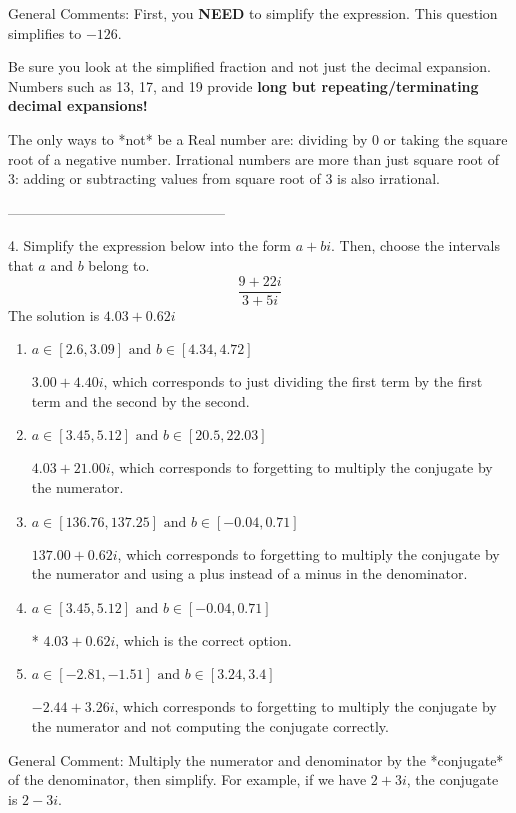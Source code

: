\documentclass{article}[14pt]
\begin{document}
General Comments: First, you \textbf{NEED} to simplify the expression. This question simplifies to $-126$. 
 
 Be sure you look at the simplified fraction and not just the decimal expansion. Numbers such as 13, 17, and 19 provide \textbf{long but repeating/terminating decimal expansions!} 
 
 The only ways to *not* be a Real number are: dividing by 0 or taking the square root of a negative number. Irrational numbers are more than just square root of 3: adding or subtracting values from square root of 3 is also irrational.

-----------------------------------------------

4. Simplify the expression below into the form $a+bi$. Then, choose the intervals that $a$ and $b$ belong to.
$$ \frac{9  + 22 i}{3  + 5 i} $$ 
The solution is $ 4.03  + 0.62 i $ 

\begin{enumerate}[label=\Alph*.] 
\item $ a \in [2.6, 3.09] \text{ and } b \in [4.34, 4.72] $ 

  $3.00  + 4.40 i$, which corresponds to just dividing the first term by the first term and the second by the second. 
\item $ a \in [3.45, 5.12] \text{ and } b \in [20.5, 22.03] $ 

  $4.03  + 21.00 i$, which corresponds to forgetting to multiply the conjugate by the numerator. 
\item $ a \in [136.76, 137.25] \text{ and } b \in [-0.04, 0.71] $ 

  $137.00  + 0.62 i$, which corresponds to forgetting to multiply the conjugate by the numerator and using a plus instead of a minus in the denominator. 
\item $ a \in [3.45, 5.12] \text{ and } b \in [-0.04, 0.71] $ 

 * $4.03  + 0.62 i$, which is the correct option. 
\item $ a \in [-2.81, -1.51] \text{ and } b \in [3.24, 3.4] $ 

  $-2.44  + 3.26 i$, which corresponds to forgetting to multiply the conjugate by the numerator and not computing the conjugate correctly. 
\end{enumerate} 
 
General Comment: Multiply the numerator and denominator by the *conjugate* of the denominator, then simplify. For example, if we have $2+3i$, the conjugate is $2-3i$.
\end{document}
